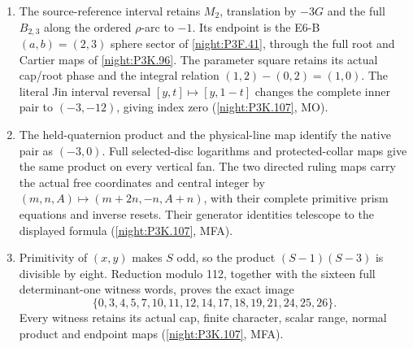 \begin{enumerate}[label=\arabic*.]
  original $M_2$ reference has a nontrivial order-three boundary
  character; its inverse cube frame has divisor
  $6F-2C_1-C_2$. Keeping that complete cube frame gives each
  closed double the pair $(-56,-401)$. Their sum
  $(-336,-2406)$ combines with the compact total to give the
  inner pair $(3,12)$ (\cref{night:P3K.107}, ML and MR).
\item The source-reference interval retains $M_2$, translation
  by $-3G$ and the full $B_{2,3}$ along the ordered $\rho$-arc
  to $-1$. Its endpoint is the E6-B $(a,b)=(2,3)$ sphere
  sector of \cref{night:P3F.41}, through the full root and
  Cartier maps of \cref{night:P3K.96}. The parameter square
  retains its actual cap/root phase and the integral relation
  $(1,2)-(0,2)=(1,0)$. The literal Jin interval reversal
  $[y,t]\mapsto[y,1-t]$ changes the complete inner pair to
  $(-3,-12)$, giving index zero
  (\cref{night:P3K.107}, MO).
\item The held-quaternion product and the physical-line map
  identify the native pair as $(-3,0)$. Full selected-disc
  logarithms and protected-collar maps give the same product
  on every vertical fan. The two directed ruling maps carry
  the actual free coordinates and central integer by
  $(m,n,A)\mapsto(m+2n,-n,A+n)$, with their complete primitive
  prism equations and inverse resets. Their generator
  identities telescope to the displayed formula
  (\cref{night:P3K.107}, MFA).
\item Primitivity of $(x,y)$ makes $S$ odd, so the product
  $(S-1)(S-3)$ is divisible by eight. Reduction modulo 112,
  together with the sixteen full determinant-one witness
  words, proves the exact image
  \[
  \{0,3,4,5,7,10,11,12,14,17,18,19,21,24,25,26\}.
  \]
  Every witness retains its actual cap, finite character,
  scalar range, normal product and endpoint maps
  (\cref{night:P3K.107}, MFA).
\end{enumerate}


